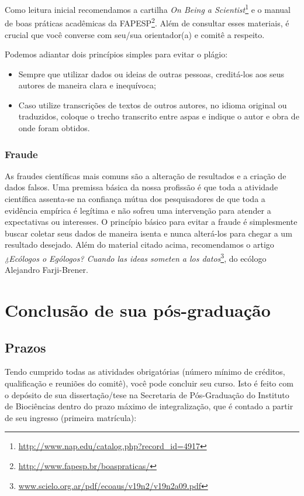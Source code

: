 \documentclass[twoside a4paper 12pt]{report}
\begin{document}
Como leitura inicial recomendamos a cartilha \emph{On Being a Scientist}\footnote{\url{http://www.nap.edu/catalog.php?record_id=4917}} e o manual de boas práticas acadêmicas da FAPESP\footnote{\url{http://www.fapesp.br/boaspraticas/}}. Além de consultar esses materiais, é crucial que você converse com seu/sua orientador(a) e comitê a respeito.

Podemos adiantar dois princípios simples para evitar o plágio:

\begin{itemize}
\item Sempre que utilizar dados ou ideias de outras pessoas, creditá-los aos seus autores de maneira clara e inequívoca;
\item Caso utilize transcrições de textos de outros autores, no idioma original ou traduzidos, coloque o trecho transcrito entre aspas e indique o autor e obra de onde foram obtidos.
\end{itemize}


\subsubsection{Fraude}
\label{sec:fraude}

As fraudes científicas mais comuns são a alteração de resultados e a criação de dados falsos. Uma premissa básica da nossa profissão é que toda a atividade científica assenta-se na confiança mútua dos pesquisadores de que toda a evidência empírica é legítima e não sofreu uma intervenção para atender a expectativas ou interesses. O princípio básico para evitar a fraude é simplesmente buscar coletar seus dados de maneira isenta e nunca alterá-los para chegar a um resultado desejado.  Além do material citado acima, recomendamos o artigo \emph{¿Ecólogos o Ególogos? Cuando las ideas someten a los datos}\footnote{\url{www.scielo.org.ar/pdf/ecoaus/v19n2/v19n2a09.pdf}}, do ecólogo Alejandro Farji-Brener.


\section{Conclusão de sua pós-graduação}
\label{sec:conclusao}

\subsection{Prazos}

Tendo cumprido todas as atividades obrigatórias (número mínimo de créditos, qualificação e reuniões do comitê), você pode concluir seu curso. Isto é feito com o depósito de sua dissertação/tese na Secretaria de Pós-Graduação do Instituto de Biociências dentro do prazo máximo de integralização, que é contado a partir de seu ingresso (primeira matrícula):
\end{document}

